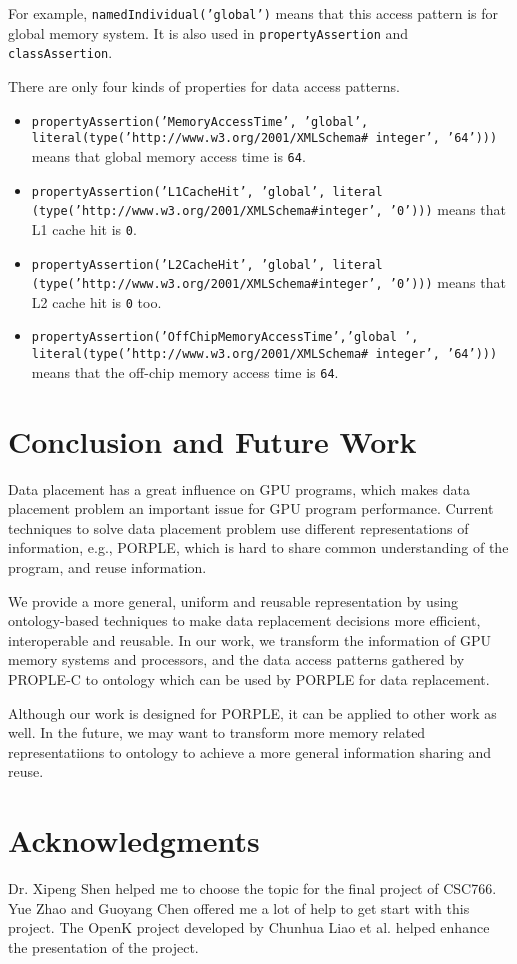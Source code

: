 \documentclass{sig-alternate}
\begin{document}
For example, \texttt{namedIndividual('global')} means that this access pattern is for global memory system. It is also used in \texttt{propertyAssertion} and \texttt{classAssertion}.

There are only four kinds of properties for data access patterns.

\begin{itemize}
	\item \texttt{propertyAssertion('MemoryAccessTime', 'global', literal(type('http://www.w3.org/2001/XMLSchema\# integer', '64')))} means that global memory access time is \texttt{64}.
	\item \texttt{propertyAssertion('L1CacheHit', 'global', literal (type('http://www.w3.org/2001/XMLSchema\#integer', '0')))} means that L1 cache hit is \texttt{0}.
	\item \texttt{propertyAssertion('L2CacheHit', 'global', literal (type('http://www.w3.org/2001/XMLSchema\#integer', '0')))} means that L2 cache hit is \texttt{0} too.
	\item \texttt{propertyAssertion('OffChipMemoryAccessTime','global ', literal(type('http://www.w3.org/2001/XMLSchema\# integer', '64')))} means that the off-chip memory access time is \texttt{64}.
\end{itemize}

\section{Conclusion and Future Work}
Data placement has a great influence on GPU programs, which makes data placement problem an important issue for GPU program performance. Current techniques to solve data placement problem use different representations of information, e.g., PORPLE, which is hard to share common understanding of the program, and reuse information. 

We provide a more general, uniform and reusable representation by using ontology-based techniques to make data replacement decisions more efficient, interoperable and reusable. In our work, we transform the information of GPU memory systems and processors, and the data access patterns gathered by PROPLE-C to ontology which can be used by PORPLE for data replacement.

Although our work is designed for PORPLE, it can be applied to other work as well. In the future, we may want to transform more memory related representatiions to ontology to achieve a more general information sharing and reuse.

\section{Acknowledgments}
Dr. Xipeng Shen helped me to choose the topic for the final project of CSC766. Yue Zhao and Guoyang Chen offered me a lot of help to get start with this project. The OpenK project developed by Chunhua Liao et al. helped enhance the presentation of the project.


 
\end{document}
